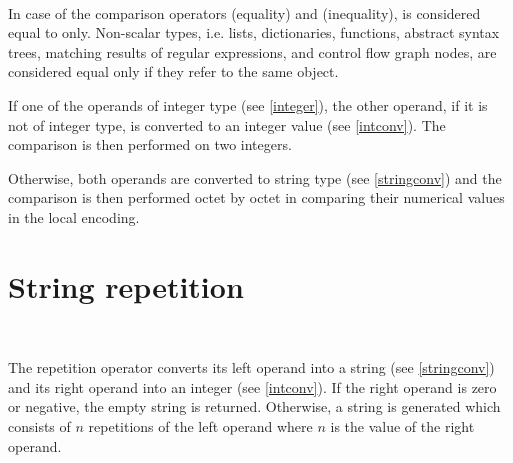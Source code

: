 \begin{grammar}
      \produces {} \\
      \produces {}
         \lextoken{==}  \\
      \produces {}
         \lextoken{!=}  \\
      \produces {}
         \lextoken{<}  \\
      \produces {}
         \lextoken{<=}  \\
      \produces {}
         \lextoken{>=}  \\
      \produces {}
         \lextoken{>} 
\end{grammar}

\noindent
In case of the comparison operators \token{==} (equality)
and \token{!=} (inequality),  is considered equal
to  only. Non-scalar types, i.e. lists, dictionaries,
functions, abstract syntax trees, matching results of regular
expressions, and control flow graph nodes, are considered equal
only if they refer to the same object.

If one of the operands of integer type (see \ref{integer}),
the other operand, if it is not of integer type, is converted to an
integer value (see \ref{intconv}). The comparison is then performed
on two integers.

Otherwise, both operands are converted to string type (see \ref{stringconv})
and the comparison is then performed octet by octet in comparing
their numerical values in the local encoding.

\section{String repetition}

\begin{grammar}
      \produces {} \\
      \produces {}
          
\end{grammar}

\noindent
The repetition operator converts its left operand into a string
(see \ref{stringconv}) and its right operand into an integer
(see \ref{intconv}). If the right operand is zero or negative,
the empty string is returned. Otherwise, a string is generated
which consists of $n$ repetitions of the left operand where
$n$ is the value of the right operand.

